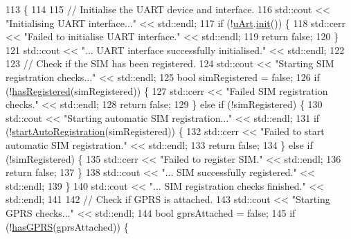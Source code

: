 \begin{DoxyCode}
113 \{
114 
115     \textcolor{comment}{// Initialise the UART device and interface.}
116     std::cout << \textcolor{stringliteral}{"Initialising UART interface..."} << std::endl;
117     \textcolor{keywordflow}{if} (!\hyperlink{class_u_blox_a034c0463d1c199d094d657c8ebb151e8}{uArt}.\hyperlink{class_u_art_a51adaa81c08d92599768c0303e5abc94}{init}()) \{
118         std::cerr << \textcolor{stringliteral}{"Failed to initialise UART interface."} << std::endl;
119         \textcolor{keywordflow}{return} \textcolor{keyword}{false};
120     \}
121     std::cout << \textcolor{stringliteral}{"... UART interface successfully initialised."} << std::endl;
122 
123     \textcolor{comment}{// Check if the SIM has been registered.}
124     std::cout << \textcolor{stringliteral}{"Starting SIM registration checks..."} << std::endl;
125     \textcolor{keywordtype}{bool} simRegistered = \textcolor{keyword}{false};
126     \textcolor{keywordflow}{if} (!\hyperlink{class_u_blox_a1889c2b9bb6087bc939bd2a27b68623b}{hasRegistered}(simRegistered)) \{
127         std::cerr << \textcolor{stringliteral}{"Failed SIM registration checks."} << std::endl;
128         \textcolor{keywordflow}{return} \textcolor{keyword}{false};
129     \} \textcolor{keywordflow}{else} \textcolor{keywordflow}{if} (!simRegistered) \{
130         std::cout << \textcolor{stringliteral}{"Starting automatic SIM registration..."} << std::endl;
131         \textcolor{keywordflow}{if} (!\hyperlink{class_u_blox_a2e816e864ebf43743b3f6187e20c2b1f}{startAutoRegistration}(simRegistered)) \{
132             std::cerr << \textcolor{stringliteral}{"Failed to start automatic SIM registration."} << std::endl;
133             \textcolor{keywordflow}{return} \textcolor{keyword}{false};
134         \} \textcolor{keywordflow}{else} \textcolor{keywordflow}{if} (!simRegistered) \{
135             std::cerr << \textcolor{stringliteral}{"Failed to register SIM."} << std::endl;
136             \textcolor{keywordflow}{return} \textcolor{keyword}{false};
137         \}
138         std::cout << \textcolor{stringliteral}{"... SIM successfully registered."} << std::endl;
139     \}
140     std::cout << \textcolor{stringliteral}{"... SIM registration checks finished."} << std::endl;
141 
142     \textcolor{comment}{// Check if GPRS is attached.}
143     std::cout << \textcolor{stringliteral}{"Starting GPRS checks..."} << std::endl;
144     \textcolor{keywordtype}{bool} gprsAttached = \textcolor{keyword}{false};
145     \textcolor{keywordflow}{if} (!\hyperlink{class_u_blox_a4f5a31b4ddda664b255ce3f63e9ffac7}{hasGPRS}(gprsAttached)) \{

\end{DoxyCode}

